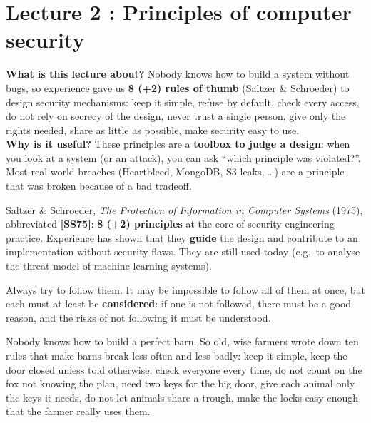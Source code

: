 \chapter{Lecture 2 : Principles of computer security}

\begin{rembox}[title=In a nutshell]
\textbf{What is this lecture about?} Nobody knows how to build a system without bugs, so
experience gave us \textbf{8 (+2) rules of thumb} (Saltzer \& Schroeder) to design
security mechanisms: keep it simple, refuse by default, check every access, do not rely on
secrecy of the design, never trust a single person, give only the rights needed, share as
little as possible, make security easy to use. \\
\textbf{Why is it useful?} These principles are a \textbf{toolbox to judge a design}: when
you look at a system (or an attack), you can ask ``which principle was violated?''. Most
real-world breaches (Heartbleed, MongoDB, S3 leaks, \ldots) are a principle that was
broken because of a bad tradeoff.
\end{rembox}

\begin{rembox}[title=Where do the principles come from?]
Saltzer \& Schroeder, \textit{The Protection of Information in Computer Systems} (1975),
abbreviated \textbf{[SS75]}: \textbf{8 (+2) principles} at the core of security
engineering practice. Experience has shown that they \textbf{guide} the design and
contribute to an implementation without security flaws. They are still used today
(e.g.\ to analyse the threat model of machine learning systems).
\end{rembox}

\begin{warnbox}[title=How to use the principles]
Always try to follow them. It may be impossible to follow all of them at once, but each must at
least be \textbf{considered}: if one is not followed, there must be a good reason, and the risks
of not following it must be understood.
\end{warnbox}

\begin{goatbox}
Nobody knows how to build a perfect barn. So old, wise farmers wrote down ten rules that make
barns break less often and less badly: keep it simple, keep the door closed unless told
otherwise, check everyone every time, do not count on the fox not knowing the plan, need two keys
for the big door, give each animal only the keys it needs, do not let animals share a trough,
make the locks easy enough that the farmer really uses them.
\end{goatbox}

